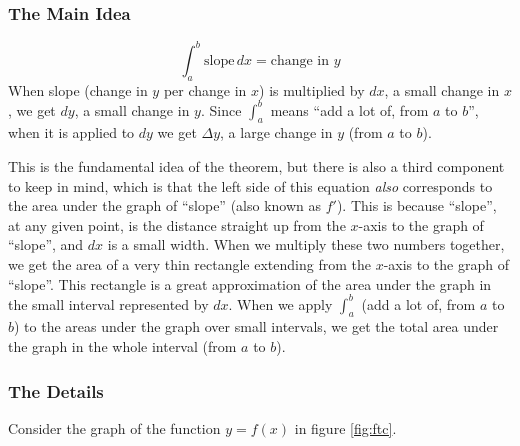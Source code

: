 \documentclass{myarticle}
\theoremstyle{nospace}
\newtheorem{old series theorem}{Theorem}
\newenvironment{series theorem}{\begin{mdframed}\begin{old series theorem}}{\end{old series theorem}\end{mdframed}}
\begin{document}
\subsubsection{The Main Idea} \label{sec:ftc idea}
\[ \int_a^b \text{slope} \,dx = \text{change in $y$} \]
When slope (change in $y$ per change in $x$) is multiplied by $dx$, a small change in $x$, we get $dy$, a small change in $y$. Since $\int_a^b$ means ``add a lot of, from $a$ to $b$'', when it is applied to $dy$ we get $\Delta y$, a large change in $y$ (from $a$ to $b$).

This is the fundamental idea of the theorem, but there is also a third component to keep in mind, which is that the left side of this equation \emph{also} corresponds to the area under the graph of ``slope'' (also known as $f'$). This is because ``slope'', at any given point, is the distance straight up from the $x$-axis to the graph of ``slope'', and $dx$ is a small width. When we multiply these two numbers together, we get the area of a very thin rectangle extending from the $x$-axis to the graph of ``slope''. This rectangle is a great approximation of the area under the graph in the small interval represented by $dx$. When we apply $\int_a^b$ (add a lot of, from $a$ to $b$) to the areas under the graph over small intervals, we get the total area under the graph in the whole interval (from $a$ to $b$).

\subsubsection{The Details} \label{sec:ftc details}

Consider the graph of the function $y = f(x)$ in figure \ref{fig:ftc}.
\end{document}
